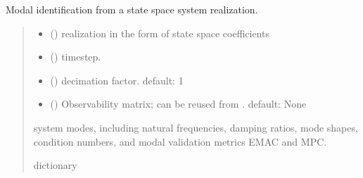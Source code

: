 \documentclass[letterpaper,10pt,english]{sphinxmanual}
\begin{document}
\begin{fulllineitems}
\label{\detokenize{library/mdof.modal:mdof.modal.system_modes}}
\pysigstartsignatures
{}
\pysigstopsignatures
\sphinxAtStartPar
Modal identification from a state space system realization.
\begin{quote}\begin{description}
\begin{itemize}
\item {} 
\sphinxAtStartPar
{} () \textendash{} realization in the form of state space coefficients 

\item {} 
\sphinxAtStartPar
{} () \textendash{} timestep.

\item {} 
\sphinxAtStartPar
{} (\sphinxstyleliteralemphasis{\sphinxupquote{, }}) \textendash{} decimation factor. default: 1

\item {} 
\sphinxAtStartPar
{} (\sphinxstyleliteralemphasis{\sphinxupquote{, }}) \textendash{} Observability matrix; can be reused from {\hyperref[\detokenize{library/mdof.realize:mdof.realize.srim}]{}}.
default: None

\end{itemize}

\sphinxAtStartPar
system modes, including natural frequencies, damping ratios, mode shapes,
condition numbers, and modal validation metrics EMAC and MPC.

\sphinxAtStartPar
dictionary

\end{description}\end{quote}

\end{fulllineitems}
\end{document}
